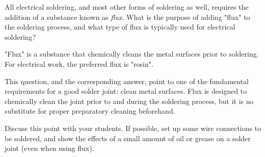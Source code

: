 

All electrical soldering, and most other forms of soldering as well, requires the addition of a substance known as {\it flux}.  What is the purpose of adding "flux" to the soldering process, and what type of flux is typically used for electrical soldering?







"Flux" is a substance that chemically cleans the metal surfaces prior to soldering.  For electrical work, the preferred flux is "rosin".







This question, and the corresponding answer, point to one of the fundamental requirements for a good solder joint: clean metal surfaces.  Flux is designed to chemically clean the joint prior to and during the soldering process, but it is no substitute for proper preparatory cleaning beforehand.

Discuss this point with your students.  If possible, set up some wire connections to be soldered, and show the effects of a small amount of oil or grease on a solder joint (even when using flux).





